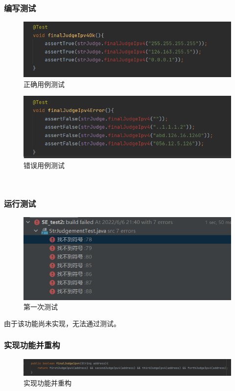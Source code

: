 \documentclass[a4paper]{article}
\begin{document}
\subsubsection*{编写测试}
\begin{figure}[h]
    \centering
    \includegraphics[scale=0.7]{5.1.png}
    \caption{正确用例测试}
    \label{fig:22}
\end{figure}
\begin{figure}[h]
    \centering
    \includegraphics[scale=0.7]{5.2.png}
    \caption{错误用例测试}
    \label{fig:23}
\end{figure}
~\\
\subsubsection*{运行测试}
\begin{figure}[h]
    \centering
    \includegraphics[scale=0.9]{5.3.png}
    \caption{第一次测试}
    \label{fig:24}
\end{figure}
由于该功能尚未实现，无法通过测试。
\subsubsection*{实现功能并重构}
\begin{figure}[h]
    \centering
    \includegraphics[scale=0.6]{5.6.png}
    \caption{实现功能并重构}
    \label{fig:25}
\end{figure}
\end{document}
